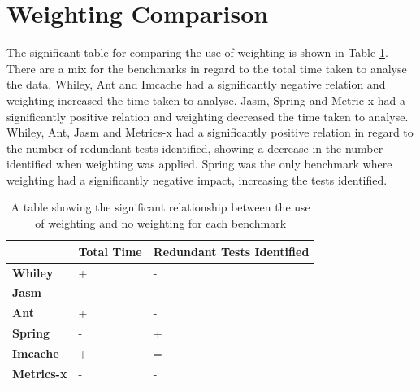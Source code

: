 \section{Weighting Comparison}

The significant table for comparing the use of weighting is shown in Table \ref{weightingsig}. There are a mix for the benchmarks in regard to the total time taken to analyse the data. Whiley, Ant and Imcache had a significantly negative relation and weighting increased the time taken to analyse. Jasm, Spring and Metric-x had a significantly positive relation and weighting decreased the time taken to analyse. Whiley, Ant, Jasm and Metrics-x had a significantly positive relation in regard to the number of redundant tests identified, showing a decrease in the number identified when weighting was applied. Spring was the only benchmark where weighting had a significantly negative impact, increasing the tests identified.

\begin{table}[h]
\centering

\label{weightingsig}
\begin{tabular}{|l|l|l|}
\hline
{\bf }          & {\bf Total Time} & {\bf Redundant Tests Identified} \\ \hline
{\bf Whiley}    & +                & -                           \\ \hline
{\bf Jasm}      & -                & -                           \\ \hline
{\bf Ant}       & +                & -                           \\ \hline
{\bf Spring}    & -                & +                           \\ \hline
{\bf Imcache}   & +                & =                           \\ \hline
{\bf Metrics-x} & -                & -                           \\ \hline
\end{tabular}
\caption{A table showing the significant relationship between the use of weighting and no weighting for each benchmark}
\end{table}


